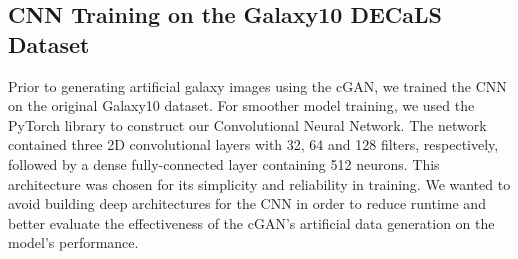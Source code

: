 \documentclass[10pt,twocolumn,letterpaper]{article}
\begin{document}
\subsection{CNN Training on the Galaxy10 DECaLS Dataset}
Prior to generating artificial galaxy images using the cGAN, we trained the CNN on the original Galaxy10 dataset.
For smoother model training, we used the PyTorch library to construct our Convolutional Neural Network.
The network contained three 2D convolutional layers with 32, 64 and 128 filters, respectively, followed by a dense fully-connected layer containing 512 neurons.
This architecture was chosen for its simplicity and reliability in training. 
We wanted to avoid building deep architectures for the CNN in order to reduce runtime and better evaluate the effectiveness of the cGAN's artificial data generation on the model's performance. 

\end{document}
